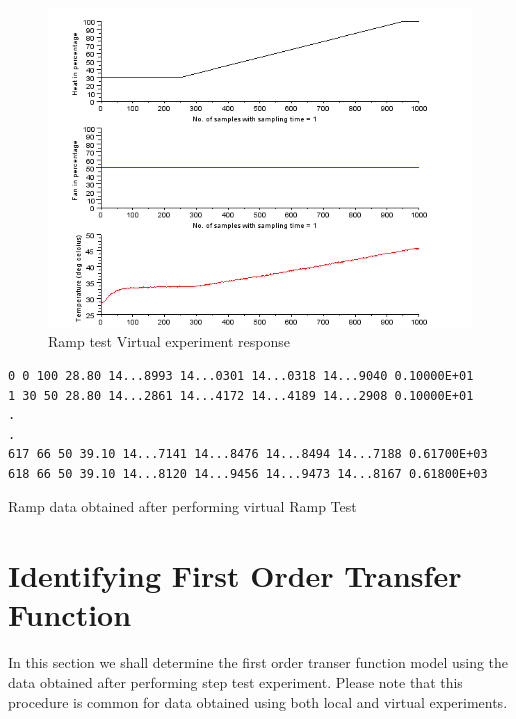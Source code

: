 \begin{figure}
\centering
\includegraphics[width=\linewidth]{Ramp-test_manual/ramp-virtual-plot.png}
\caption{Ramp test Virtual experiment response}
\label{ramp-virtual}
\end{figure}


\begin{table}
\begin{verbatim}
0 0 100 28.80 14...8993 14...0301 14...0318 14...9040 0.10000E+01
1 30 50 28.80 14...2861 14...4172 14...4189 14...2908 0.10000E+01
.
.
617 66 50 39.10 14...7141 14...8476 14...8494 14...7188 0.61700E+03
618 66 50 39.10 14...8120 14...9456 14...9473 14...8167 0.61800E+03
\end{verbatim}
\caption{Ramp data obtained after performing virtual Ramp Test}
\label{rampdata}
\end{table}



\section{Identifying First Order Transfer Function}
In this section we shall determine the first order transer function model using the data obtained after performing step test experiment. Please note that this procedure is common for data obtained using both local and virtual experiments.


